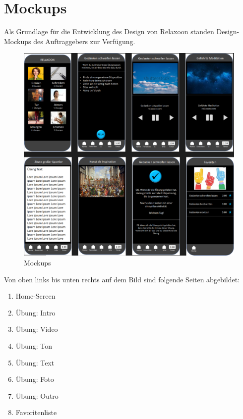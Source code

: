 
\section{Mockups}

Als Grundlage für die Entwicklung des Design von Relaxoon standen Design-Mockups des Auftraggebers zur Verfügung.

\begin{figure}[H]
    \centering
    \includegraphics[height=\textwidth]{./pics/mockups.png}
    \caption{Mockups}
\end{figure}

Von oben links bis unten rechts auf dem Bild sind folgende Seiten abgebildet:

\begin{enumerate}
    \item Home-Screen
    \item Übung: Intro
    \item Übung: Video 
    \item Übung: Ton 
    \item Übung: Text 
    \item Übung: Foto 
    \item Übung: Outro
    \item Favoritenliste
\end{enumerate}

